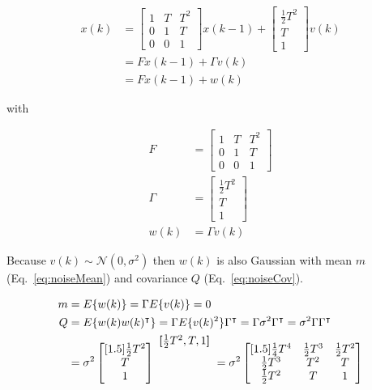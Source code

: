 \documentclass{article}
\newenvironment{rowvector}
 {\bm{[}\begin{matrix}}
 {\end{matrix}\bm{]}}
\begin{document}
\begin{align}
    x(k)&=\begin{bmatrix}
        1 & T & T^2\\
        0 & 1 & T\\
        0 & 0 & 1
           \end{bmatrix}
           x(k-1)+
           \begin{bmatrix}
               \frac{1}{2}T^2\\
               T\\
               1
           \end{bmatrix}
           v(k)\nonumber\\
           &=Fx(k-1)+\Gamma v(k)\nonumber\\
           &=Fx(k-1)+w(k)\label{eq:DWPAmodel}
\end{align}

\noindent with 

\begin{align}
    F&=\begin{bmatrix}
          1 & T & T^2\\
          0 & 1 & T\\
          0 & 0 & 1
       \end{bmatrix}\nonumber\\
    \Gamma&=\begin{bmatrix}
               \frac{1}{2}T^2\\
               T\\
               1
            \end{bmatrix}\nonumber\\
    w(k)&=\Gamma v(k)\nonumber
\end{align}

Because $v(k)\sim\mathcal{N}(0,\sigma^2)$ then $w(k)$ is also Gaussian with
mean $m$ (Eq.~\ref{eq:noiseMean}) and covariance $Q$ (Eq.~\ref{eq:noiseCov}).

\begin{align}
    m&=E\{w(k)\}=\Gamma E\{v(k)\}=0\label{eq:noiseMean}\\
    Q&=E\{w(k)w(k)^\intercal\}=\Gamma
    E\{v(k)^2\}\Gamma^\intercal=\Gamma\sigma^2\Gamma^\intercal=\sigma^2\Gamma\Gamma^\intercal\nonumber\\
     &=\sigma^2\begin{bmatrix}[1.5]
                 \frac{1}{2}T^2\\
                 T\\
                 1
       \end{bmatrix}
     \raisebox{4.5ex}{
         $\begin{rowvector}\frac{1}{2}T^2, T, 1\end{rowvector}$
     }=\sigma^2\begin{bmatrix}[1.5]
                   \frac{1}{4}T^4&\frac{1}{2}T^3&\frac{1}{2}T^2\\
                   \frac{1}{2}T^3&T^2&T\\
                   \frac{1}{2}T^2&T&1
                \end{bmatrix}\label{eq:noiseCov}
\end{align}
\end{document}
